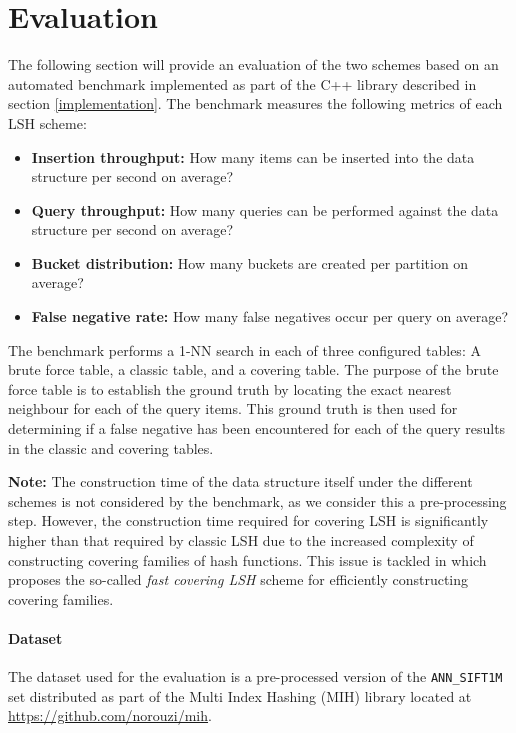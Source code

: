 \section{Evaluation}
\label{evaluation}

The following section will provide an evaluation of the two schemes based on an automated benchmark implemented as part of the C++ library described in section \ref{implementation}. The benchmark measures the following metrics of each LSH scheme:

\begin{itemize}
  \item \textbf{Insertion throughput:} How many items can be inserted into the data structure per second on average?
  \item \textbf{Query throughput:} How many queries can be performed against the data structure per second on average?
  \item \textbf{Bucket distribution:} How many buckets are created per partition on average?
  \item \textbf{False negative rate:} How many false negatives occur per query on average?
\end{itemize}

The benchmark performs a 1-NN search in each of three configured tables: A brute force table, a classic table, and a covering table. The purpose of the brute force table is to establish the ground truth by locating the exact nearest neighbour for each of the query items. This ground truth is then used for determining if a false negative has been encountered for each of the query results in the classic and covering tables.

\textbf{Note:} The construction time of the data structure itself under the different schemes is not considered by the benchmark, as we consider this a pre-processing step. However, the construction time required for covering LSH is significantly higher than that required by classic LSH due to the increased complexity of constructing covering families of hash functions. This issue is tackled in \cite{DBLP:journals/corr/PhamP16} which proposes the so-called \textit{fast covering LSH} scheme for efficiently constructing covering families.

\paragraph{Dataset} The dataset used for the evaluation is a pre-processed version of the \texttt{ANN\_SIFT1M} set distributed as part of the Multi Index Hashing (MIH) library located at \url{https://github.com/norouzi/mih}.

